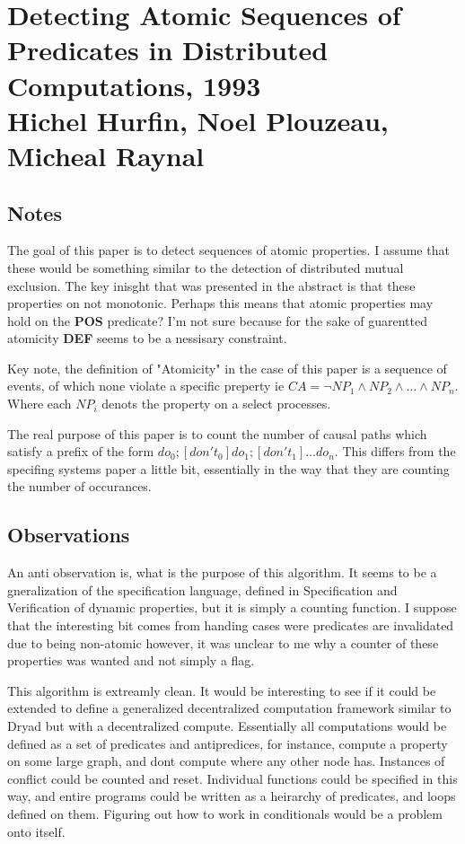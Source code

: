 \section{Detecting Atomic Sequences of Predicates in Distributed Computations, 1993 \\ 
\small{Hichel Hurfin, Noel Plouzeau, Micheal Raynal}}

\subsection{Notes}

The goal of this paper is to detect sequences of atomic properties. I assume
that these would be something similar to the detection of distributed mutual
exclusion. The key inisght that was presented in the abstract is that these
properties on not monotonic. Perhaps this means that atomic properties may hold
on the \textbf{POS} predicate? I'm not sure because for the sake of guarentted
atomicity \textbf{DEF} seems to be a nessisary constraint.

Key note, the definition of "Atomicity" in the case of this paper is a sequence
of events, of which none violate a specific preperty ie $CA = \neg NP_1 \wedge
NP_2 \wedge \dots \wedge NP_n$. Where each $NP_i$ denots the property on a
select processes.

The real purpose of this paper is to count the number of causal paths which
satisfy a prefix of the form $do_0;[don't_0] do_1; [don't_1] \dots do_n$. This
differs from the specifing systems paper a little bit, essentially in the way
that they are counting the number of occurances.

\subsection{Observations}

An anti observation is, what is the purpose of this algorithm. It seems to be a
gneralization of the specification language, defined in Specification and
Verification of dynamic properties, but it is simply a counting function. I
suppose that the interesting bit comes from handing cases were predicates are
invalidated due to being non-atomic however, it was unclear to me why a counter
of these properties was wanted and not simply a flag.

This algorithm is extreamly clean. It would be interesting to see if it could
be extended to define a generalized decentralized computation framework similar
to Dryad but with a decentralized compute. Essentially all computations would
be defined as a set of predicates and antipredices, for instance, compute a
property on some large graph, and dont compute where any other node has.
Instances of conflict could be counted and reset. Individual functions could be
specified in this way, and entire programs could be written as a heirarchy of
predicates, and loops defined on them. Figuring out how to work in conditionals
would be a problem onto itself.

